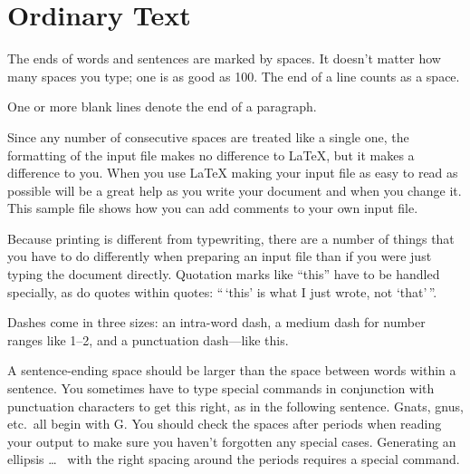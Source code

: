 	\chapter{Ordinary Text} 	%
	

	
	The ends  of words and sentences are marked 
	by   spaces. It  doesn't matter how many 
	spaces    you type; one is as good as 100.  The
	end of   a line counts as a space.
	
	One   or more   blank lines denote the  end 
	of  a paragraph.  
	
	Since any number of consecutive spaces are treated
	like a single one, the formatting of the input
	file makes no difference to
	\LaTeX,                %
	but it makes a difference to you.  When you use 
	\LaTeX %
	making your input file as easy to read
	as possible will be a great help as you write 
	your document and when you change it.  This sample 
	file shows how you can add comments to your own input 
	file.
	
	Because printing is different from typewriting,
	there are a number of things that you have to do
	differently when preparing an input file than if
	you were just typing the document directly.
	Quotation marks like
	``this'' 
	have to be handled specially, as do quotes within
	quotes:
	``\,`this'            %
	is what I just 
	wrote, not  `that'\,''.  
	
	Dashes come in three sizes: an 
	intra-word 
	dash, a medium dash for number ranges like 
	1--2, 
	and a punctuation 
	dash---like 
	this.
	
	A sentence-ending space should be larger than the
	space between words within a sentence.  You
	sometimes have to type special commands in
	conjunction with punctuation characters to get
	this right, as in the following sentence.
	Gnats, gnus, etc.\ all  %
	begin with G\@.         %
	You should check the spaces after periods when
	reading your output to make sure you haven't
	forgotten any special cases.  Generating an
	ellipsis
	\ldots\               %
	with the right spacing around the periods requires
	a special command.
	
